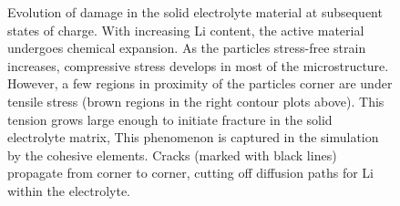 \documentclass[final,5p,sort&compress]{elsarticle}
\begin{document}
\begin{figure} 
\centering
{}


\caption{Evolution of damage in the solid electrolyte material at subsequent states of charge.
With increasing Li content, the active material undergoes chemical expansion. As the particles stress-free strain increases, compressive stress develops in most of the microstructure. However, a few regions in proximity of the particles corner are under tensile stress (brown regions in the right contour plots above). This tension grows large enough to initiate fracture in the solid electrolyte matrix, This phenomenon is captured in the simulation by the cohesive elements. Cracks (marked with black lines) propagate from corner to corner, cutting off diffusion paths for Li within the electrolyte.}
\label{fig:fractureSE_contours}
\end{figure}
\end{document}
